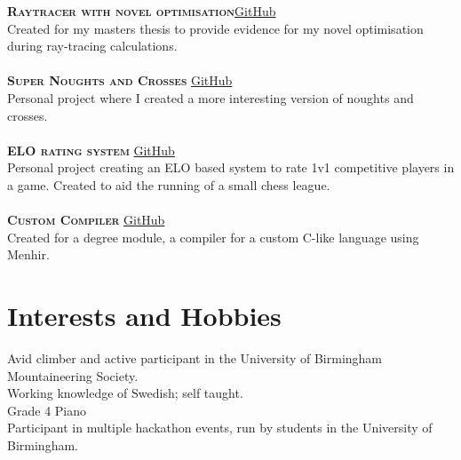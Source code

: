 \documentclass[a4paper, 10pt]{article}
\begin{document}
  \textsc{\textbf{Raytracer with novel optimisation}}\hfill \footnotesize \href{https://github.com/Precastwig/RayTracer}{GitHub} \\
 Created for my masters thesis to provide evidence for my novel optimisation during ray-tracing calculations.\\\\
 \normalsize
  \textsc{\textbf{Super Noughts and Crosses}} \hfill \footnotesize \href{https://github.com/Precastwig/SuperNandX}{GitHub}\\
 Personal project where I created a more interesting version of noughts and crosses.\\\\
 \normalsize 
  \textsc{\textbf{ELO rating system}} \hfill \footnotesize \href{https://github.com/Precastwig/ELOSystem}{GitHub}\\
 Personal project creating an ELO based system to rate 1v1 competitive players in a game. Created to aid the running of a small chess league.\\\\
 \normalsize 
  \textsc{\textbf{Custom Compiler}} \hfill \footnotesize \href{https://github.com/Precastwig/Compiler-Construction}{GitHub}\\
 Created for a degree module, a compiler for a custom C-like language using Menhir.
\normalsize
\section{Interests and Hobbies}
 Avid climber and active participant in the University of Birmingham Mountaineering Society.\\
 Working knowledge of Swedish; self taught.\\
 Grade 4 Piano\\
 Participant in multiple hackathon events, run by students in the University of Birmingham.\\
\end{document}
